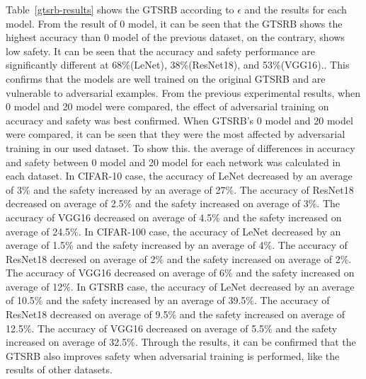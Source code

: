 \documentclass[journal,article,submit,moreauthors,pdftex]{Definitions/mdpi}
\begin{document}
Table~\ref{gtsrb-results} shows the GTSRB according to \begin{math}\epsilon\end{math} and the results for each model.
From the result of 0 model, it can be seen that the GTSRB shows the highest accuracy than 0 model of the previous dataset, on the contrary, shows low safety.
It can be seen that the accuracy and safety performance are significantly different at 68\%(LeNet), 38\%(ResNet18), and 53\%(VGG16)..
This confirms that the models are well trained on the original GTSRB and are vulnerable to adversarial examples.
From the previous experimental results, when 0 model and 20 model were compared, the effect of adversarial training on accuracy and safety was best confirmed.
When GTSRB's 0 model and 20 model were compared, it can be seen that they were the most affected by adversarial training in our used dataset.
To show this. the average of differences in accuracy and safety between 0 model and 20 model for each network was calculated in each dataset.
In CIFAR-10 case, the accuracy of LeNet decreased by an average of 3\% and the safety increased by an average of 27\%.
The accuracy of ResNet18 decreased on average of 2.5\% and the safety increased on average of 3\%.
The accuracy of VGG16 decreased on average of 4.5\% and the safety increased on average of 24.5\%.
In CIFAR-100 case, the accuracy of LeNet decreased by an average of 1.5\% and the safety increased by an average of 4\%.
The accuracy of ResNet18 decresed on average of 2\% and the safety increased on average of 2\%.
The accuracy of VGG16 decreased on average of 6\% and the safety increased on average of 12\%.
In GTSRB case, the accuracy of LeNet decreased by an average of 10.5\% and the safety increased by an average of 39.5\%.
The accuracy of ResNet18 decreased on average of 9.5\% and the safety increased on average of 12.5\%.
The accuracy of VGG16 decreased on average of 5.5\% and the safety increased on average of 32.5\%.
Through the results, it can be confirmed that the GTSRB also improves safety when adversarial training is performed, like the results of other datasets.
\end{document}
